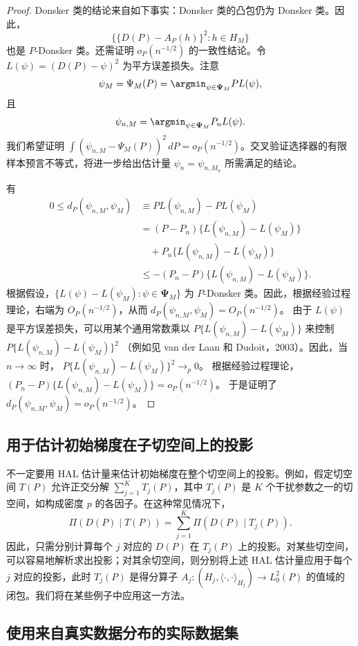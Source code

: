 \begin{proof}
Donsker 类的结论来自如下事实：Donsker 类的凸包仍为 Donsker 类。因此，
\[
 \bigl\{\{D(P)-A_P(h)\}^2:h\in H_M\bigr\}
\]
也是 $P$-Donsker 类。还需证明 $o_P(n^{-1/2})$ 的一致性结论。令
$L(\psi)=(D(P)-\psi)^2$ 为平方误差损失。注意
\[
 \psi_M=\Psi_M(P)=\argmin_{\psi\in\boldsymbol{\Psi}_M}PL(\psi),
\]
且
\[
 \psi_{n,M}=\argmin_{\psi\in\boldsymbol{\Psi}_M}P_nL(\psi).
\]
我们希望证明 $\int(\psi_{n,M}-\Psi_M(P))^2\,dP=o_P(n^{-1/2})$。交叉验证选择器的有限样本预言不等式，将进一步给出估计量 $\psi_n=\psi_{n,M_n}$ 所需满足的结论。

有
\[
 \begin{aligned}
 0\leq d_P(\psi_{n,M},\psi_M)
 &\equiv PL(\psi_{n,M})-PL(\psi_M)\\
 &=(P-P_n)\{L(\psi_{n,M})-L(\psi_M)\}\\
 &\quad+P_n\{L(\psi_{n,M})-L(\psi_M)\}\\
 &\leq-(P_n-P)\{L(\psi_{n,M})-L(\psi_M)\}.
 \end{aligned}
\]
根据假设，$\{L(\psi)-L(\psi_M):\psi\in\boldsymbol{\Psi}_M\}$ 为 $P$-Donsker 类。因此，根据经验过程理论，右端为 $O_P(n^{-1/2})$，从而
$d_P(\psi_{n,M},\psi_M)=O_P(n^{-1/2})$。
由于 $L(\psi)$ 是平方误差损失，可以用某个通用常数乘以
$P\{L(\psi_{n,M})-L(\psi_M)\}$
来控制
$P\{L(\psi_{n,M})-L(\psi_M)\}^2$
（例如见 van der Laan 和 Dudoit，2003）。因此，当 $n\to\infty$ 时，
$P\{L(\psi_{n,M})-L(\psi_M)\}^2\to_p0$。
根据经验过程理论，
$(P_n-P)\{L(\psi_{n,M})-L(\psi_M)\}=o_P(n^{-1/2})$。
于是证明了 $d_P(\psi_{n,M},\psi_M)=o_P(n^{-1/2})$。
\end{proof}

\subsection{用于估计初始梯度在子切空间上的投影}

不一定要用 HAL 估计量来估计初始梯度在整个切空间上的投影。例如，假定切空间 $T(P)$ 允许正交分解 $\sum_{j=1}^K T_j(P)$，其中 $T_j(P)$ 是 $K$ 个干扰参数之一的切空间，如构成密度 $p$ 的各因子。在这种常见情况下，
\[
 \Pi(D(P)\mid T(P))
 =\sum_{j=1}^K\Pi(D(P)\mid T_j(P)).
\]
因此，只需分别计算每个 $j$ 对应的 $D(P)$ 在 $T_j(P)$ 上的投影。对某些切空间，可以容易地解析求出投影；对其余切空间，则分别将上述 HAL 估计量应用于每个 $j$ 对应的投影，此时 $T_j(P)$ 是得分算子
$A_j:(H_j,\langle\cdot,\cdot\rangle_{H_j})\to L_0^2(P)$
的值域的闭包。我们将在某些例子中应用这一方法。

\subsection{使用来自真实数据分布的实际数据集}

